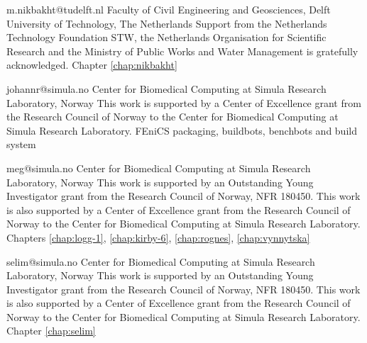 
             {m.nikbakht@tudelft.nl}
             {Faculty of Civil Engineering and Geosciences,
             Delft University of Technology, The Netherlands}
             {Support from the Netherlands Technology Foundation STW,
              the Netherlands Organisation for Scientific Research
              and the Ministry of Public Works and Water Management is
              gratefully acknowledged.}
             {Chapter \ref{chap:nikbakht}}


             {johannr@simula.no}
             {Center for Biomedical Computing at Simula Research Laboratory, Norway}
             {This work is supported by a Center of Excellence grant
              from the Research Council of Norway to the Center for
              Biomedical Computing at Simula Research Laboratory.}
             {FEniCS packaging, buildbots, benchbots and build system}

             {meg@simula.no}
             {Center for Biomedical Computing at Simula Research Laboratory, Norway}
             {This work is supported by an Outstanding Young
              Investigator grant from the Research Council of Norway,
              NFR 180450. This work is also supported by a Center of
              Excellence grant from the Research Council of Norway to
              the Center for Biomedical Computing at Simula Research
              Laboratory.}
             {Chapters
              \ref{chap:logg-1}, \ref{chap:kirby-6}, \ref{chap:rognes}, \ref{chap:vynnytska}}



             {selim@simula.no}
             {Center for Biomedical Computing at Simula Research Laboratory, Norway}
             {This work is supported by an Outstanding Young
              Investigator grant from the Research Council of Norway,
              NFR 180450. This work is also supported by a Center of
              Excellence grant from the Research Council of Norway to
              the Center for Biomedical Computing at Simula Research
              Laboratory.}
             {Chapter \ref{chap:selim}}


